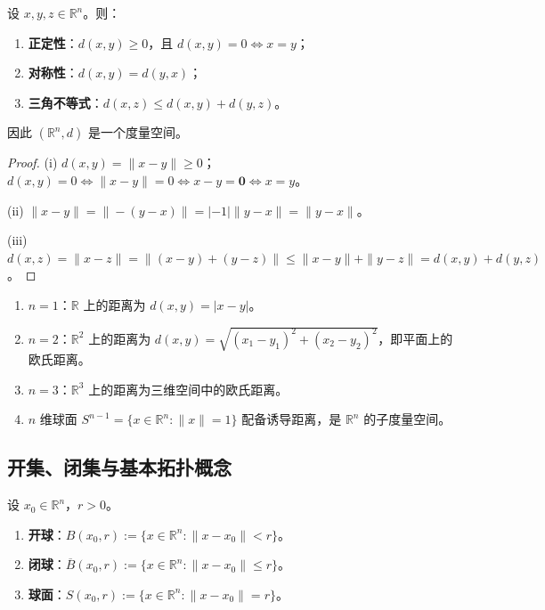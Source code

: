 \begin{corollary}[距离的三条公理]\label{cor:metric_axioms}
设 $x, y, z \in \mathbb{R}^n$。则：
\begin{enumerate}[label=(\roman*)]
    \item \textbf{正定性}：$d(x, y) \ge 0$，且 $d(x, y) = 0 \iff x = y$；
    \item \textbf{对称性}：$d(x, y) = d(y, x)$；
    \item \textbf{三角不等式}：$d(x, z) \le d(x, y) + d(y, z)$。
\end{enumerate}
因此 $(\mathbb{R}^n, d)$ 是一个度量空间。
\end{corollary}

\begin{proof}
(i) $d(x, y) = \|x - y\| \ge 0$；$d(x, y) = 0 \iff \|x - y\| = 0 \iff x - y = \mathbf{0} \iff x = y$。

(ii) $\|x - y\| = \|-(y - x)\| = |-1| \|y - x\| = \|y - x\|$。

(iii) $d(x, z) = \|x - z\| = \|(x - y) + (y - z)\| \le \|x - y\| + \|y - z\| = d(x, y) + d(y, z)$。
\end{proof}

\begin{example}\label{ex:euclidean_examples}
\begin{enumerate}[label=(\roman*)]
    \item $n = 1$：$\mathbb{R}$ 上的距离为 $d(x, y) = |x - y|$。
    \item $n = 2$：$\mathbb{R}^2$ 上的距离为 $d(x, y) = \sqrt{(x_1 - y_1)^2 + (x_2 - y_2)^2}$，即平面上的欧氏距离。
    \item $n = 3$：$\mathbb{R}^3$ 上的距离为三维空间中的欧氏距离。
    \item $n$ 维球面 $S^{n-1} = \{x \in \mathbb{R}^n : \|x\| = 1\}$ 配备诱导距离，是 $\mathbb{R}^n$ 的子度量空间。
\end{enumerate}
\end{example}

\subsection{开集、闭集与基本拓扑概念}

\begin{definition}[开球与球邻域]\label{def:open_ball}
设 $x_0 \in \mathbb{R}^n$，$r > 0$。
\begin{enumerate}[label=(\roman*)]
    \item \textbf{开球}：$B(x_0, r) := \{x \in \mathbb{R}^n : \|x - x_0\| < r\}$。
    \item \textbf{闭球}：$\overline{B}(x_0, r) := \{x \in \mathbb{R}^n : \|x - x_0\| \le r\}$。
    \item \textbf{球面}：$S(x_0, r) := \{x \in \mathbb{R}^n : \|x - x_0\| = r\}$。
\end{enumerate}
\end{definition}

